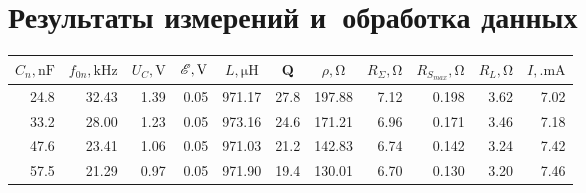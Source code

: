 \documentclass[12pt, a4paper]{article}
\begin{document}
\newpage
\section{Результаты измерений и~обработка данных}

\begin{table}[H]
  \begin{tabular}{|rrrr|r|rrrr|r|r|}
    \hline
    \multicolumn{1}{|c|}{$C_n, \text{nF}$} & \multicolumn{1}{c|}{$f_{0n}, \text{kHz}$} & \multicolumn{1}{c|}{$U_C, \text{V}$} & \multicolumn{1}{c|}{$\mathscr{E}, \text{V}$} & \multicolumn{1}{c|}{$L, \mathrm{\mu H}$} & \multicolumn{1}{c|}{Q}    & \multicolumn{1}{c|}{$\rho, \mathrm{\Omega}$} & \multicolumn{1}{c|}{$R_\Sigma, \mathrm{\Omega}$} & \multicolumn{1}{c|}{$R_{S_{max}}, \mathrm{\Omega}$} & \multicolumn{1}{c|}{$R_L, \mathrm{\Omega}$} & \multicolumn{1}{c|}{$I,.\text{mA}$} \\ \hline
    \multicolumn{1}{|r|}{24.8}             & \multicolumn{1}{r|}{32.43}                & \multicolumn{1}{r|}{1.39}            & 0.05                                  & 971.17                                   & \multicolumn{1}{r|}{27.8} & \multicolumn{1}{r|}{197.88}                  & \multicolumn{1}{r|}{7.12}                        & 0.198                                               & 3.62                                        & 7.02                                    \\ \hline
    \multicolumn{1}{|r|}{33.2}             & \multicolumn{1}{r|}{28.00}                & \multicolumn{1}{r|}{1.23}            & 0.05                                  & 973.16                                   & \multicolumn{1}{r|}{24.6} & \multicolumn{1}{r|}{171.21}                  & \multicolumn{1}{r|}{6.96}                        & 0.171                                               & 3.46                                        & 7.18                                    \\ \hline
    \multicolumn{1}{|r|}{47.6}             & \multicolumn{1}{r|}{23.41}                & \multicolumn{1}{r|}{1.06}            & 0.05                                  & 971.03                                   & \multicolumn{1}{r|}{21.2} & \multicolumn{1}{r|}{142.83}                  & \multicolumn{1}{r|}{6.74}                        & 0.142                                               & 3.24                                        & 7.42                                    \\ \hline
    \multicolumn{1}{|r|}{57.5}             & \multicolumn{1}{r|}{21.29}                & \multicolumn{1}{r|}{0.97}            & 0.05                                  & 971.90                                   & \multicolumn{1}{r|}{19.4} & \multicolumn{1}{r|}{130.01}                  & \multicolumn{1}{r|}{6.70}                        & 0.130                                               & 3.20                                        & 7.46                                    \\ \hline

\end{tabular}
\end{table}
\end{document}
